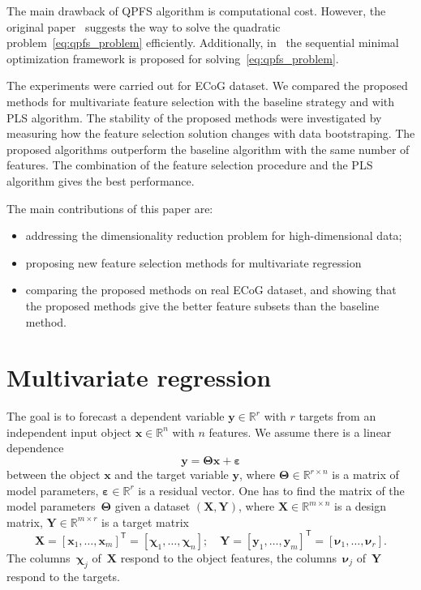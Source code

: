 \documentclass[12pt,twoside]{article}
\theoremstyle{definition}
\newcommand{\bx}{\mathbf{x}}
\newcommand{\by}{\mathbf{y}}
\newcommand{\bY}{\mathbf{Y}}
\newcommand{\bX}{\mathbf{X}}
\newcommand{\bbR}{\mathbb{R}}
\newcommand{\T}{\mathsf{T}}
\newcommand{\bchi}{\boldsymbol{\chi}}
\newcommand{\bnu}{\boldsymbol{\nu}}
\newcommand{\bTheta}{\boldsymbol{\Theta}}
\begin{document}
The main drawback of QPFS algorithm is computational cost. However, the original paper~\cite{rodriguez2010quadratic} suggests the way to solve the quadratic problem~\eqref{eq:qpfs_problem} efficiently. Additionally, in~\cite{prasad2013scaling} the sequential minimal optimization framework is proposed for solving~\eqref{eq:qpfs_problem}.

The experiments were carried out for ECoG dataset.
We compared the proposed methods for multivariate feature selection with the baseline strategy and with PLS algorithm. 
The stability of the proposed methods were investigated by measuring how the feature selection solution changes with data bootstraping.
The proposed algorithms outperform the baseline algorithm with the same number of features. 
The combination of the feature selection procedure and the PLS algorithm gives the best performance.

The main contributions of this paper are:
\begin{itemize}
	\item addressing the dimensionality reduction problem for high-dimensional data;
	\item proposing new feature selection methods for multivariate regression
	\item comparing the proposed methods on real ECoG dataset, and showing that the proposed methods give the better feature subsets than the baseline method.
\end{itemize}

\section{Multivariate regression}

The goal is to forecast a dependent variable $\by \in \bbR^r$ with $r$ targets from an independent input object $\bx \in \bbR^n$ with $n$ features.
We assume there is a linear dependence
\begin{equation}
\by = \bTheta \bx+ \boldsymbol{\varepsilon}
\label{eq:model}
\end{equation}
between the object $\bx$ and the target variable $\by$,
where $\bTheta \in \bbR^{r \times n}$ is a matrix of model parameters, $\boldsymbol{\varepsilon} \in \bbR^{r}$ is a residual vector.
One has to find the matrix of the model parameters~$\bTheta$ given a dataset $\left( \bX, \bY \right)$, where $\bX \in \bbR^{m \times n}$ is a design matrix, $\bY \in \bbR^{m \times r}$ is a target matrix
\begin{equation*}
\bX = [\bx_1, \dots, \bx_m]^{\T} =  [\bchi_1, \dots, \bchi_n]; \quad \bY = [\by_1, \dots, \by_m]^{\T} =  [\bnu_1, \dots, \bnu_r].
\end{equation*}
The columns~$\bchi_j$ of~$\bX$ respond to the object features, the columns~$\bnu_j$ of~$\bY$ respond to the targets.
\end{document}
